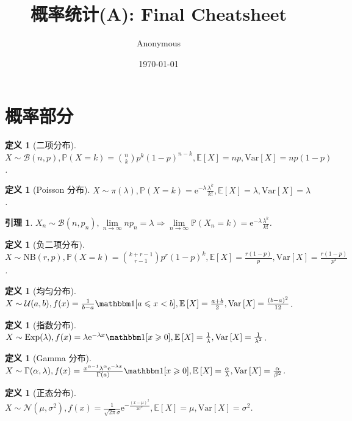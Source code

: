 \documentclass[8pt]{article}
\title{\heiti\zihao{2} 概率统计(A): Final Cheatsheet}
\author{\kaishu\zihao{-3} Anonymous}
\date{\today}
\theoremstyle{compact}
\newtheorem{lemma}[theorem]{引理}
\newtheorem{definition}[theorem]{定义}
\def\le{\leqslant}
\def\ge{\geqslant}
\def\P#1{\mathbb{P}\left({#1}\right)}
\def\e{\mathrm{e}}
\def\E#1{\mathbb{E}\left[{#1}\right]}
\def\Var#1{\text{Var}\left[{#1}\right]}
\begin{document}
\pagestyle{plain}

\maketitle

\section{概率部分}
\begin{definition}[二项分布]
	$X \sim \mathcal B(n, p), \P{X = k} = \binom nk p^k (1-p)^{n-k}, \E{X} = np, \Var{X} = np(1-p)$.
\end{definition}
\begin{definition}[Poisson 分布]
	$X \sim \pi(\lambda), \P{X = k} = \e^{-\lambda}\frac{\lambda^k}{k!}, \E{X} = \lambda, \Var{X} = \lambda$.
\end{definition}
\begin{lemma}
	$X_n \sim \mathcal B(n, p_n), \lim\limits_{n \to \infty}np_n = \lambda \Rightarrow \lim\limits_{n \to \infty} \P{X_n = k} = \e^{-\lambda}\frac{\lambda^k}{k!}$.
\end{lemma}
\begin{definition}[负二项分布]
	$X \sim \text{NB}(r, p), \P{X = k} = \binom{k + r - 1}{r - 1}p^r(1-p)^{k}, \E{X} = \frac{r(1-p)}{p}, \Var{X} = \frac{r(1-p)}{p^2}$.
\end{definition}
\begin{definition}[均匀分布]
	$X \sim \mathcal U(a, b), f(x) = \frac{1}{b-a}\mathbbm 1[a \le x < b], \E{X} = \frac{a + b}{2}, \Var{X} = \frac{(b - a)^2}{12}$.
\end{definition}
\begin{definition}[指数分布]
	$X \sim \text{Exp}(\lambda), f(x) = \lambda \e^{-\lambda x} \mathbbm 1[x \ge 0], \E{X} = \frac1\lambda, \Var{X} = \frac1{\lambda^2}$.
\end{definition}
\begin{definition}[Gamma 分布]
	$X \sim \Gamma(\alpha, \lambda), f(x) = \frac{x^{\alpha - 1}\lambda^{\alpha}\e^{-\lambda x}}{\Gamma(a)}\mathbbm 1[x \ge 0], \E{X} = \frac{\alpha}{\lambda}, \Var{X} = \frac{\alpha}{\beta^2}$.
\end{definition}
\begin{definition}[正态分布]
	$X \sim \mathcal N(\mu, \sigma^2), f(x) = \frac{1}{\sqrt{2\pi}\sigma}\e^{-\frac{(x - \mu)^2}{2\sigma^2}}, \E{X} = \mu, \Var{X} = \sigma^2$.
\end{definition}
\end{document}
